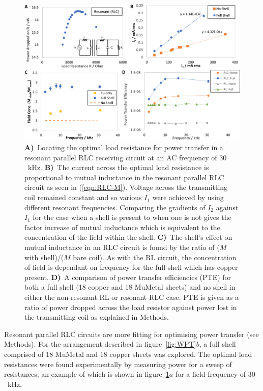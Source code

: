 \documentclass[11pt]{iopart}
\begin{document}
\begin{figure}
  \begin{center}
   \noindent\includegraphics[width=0.9\linewidth]{images/compoundRLC-inset.pdf}
  \end{center}
  \caption{
    \textbf{A)}~Locating the optimal load resistance for power transfer in a resonant
    parallel RLC receiving circuit at an AC frequency of $30$~kHz.
    \textbf{B)}~The current across the optimal load resistance is proportional to
    mutual inductance in the resonant parallel RLC circuit as seen in
    (\ref{eqn:RLC-M}). Voltage across the transmitting coil
    remained constant and so various $I_1$ were achieved by using
    different resonant frequencies. Comparing the gradients of $I_2$
    against $I_1$ for the case when a shell is present to when one is
    not gives the factor increase of mutual inductance which
    is equivalent to the concentration of the field within the shell.
    \textbf{C)}~The shell's effect on mutual inductance in an RLC circuit is
    found by the ratio of ($M$ with shell)/($M$ bare coil). As with
    the RL circuit, the concentration of field is dependant on
    frequency for the full shell which has copper present.
    \textbf{D)}~A comparison of power transfer efficiencies (PTE) for both a
    full shell (18 copper and 18 MuMetal sheets) and no shell in either
    the non-resonant RL or resonant RLC case. PTE is given as a ratio of power dropped
    across the load resistor against power lost in the transmitting
    coil as explained in Methods.
  }
  \label{fig:cpdRLC}
\end{figure}

Resonant parallel RLC circuits are more fitting for optimising power
transfer (see Methods). For the arrangement
described in figure~\ref{fig:WPT}$b$, a full shell comprised of $18$
MuMetal and $18$ copper sheets was explored. The optimal load
resistances were found experimentally by measuring power for a sweep
of resistances, an example of which is shown in
figure~\ref{fig:cpdRLC}$a$ for a field frequency of $30$~kHz.
\end{document}
